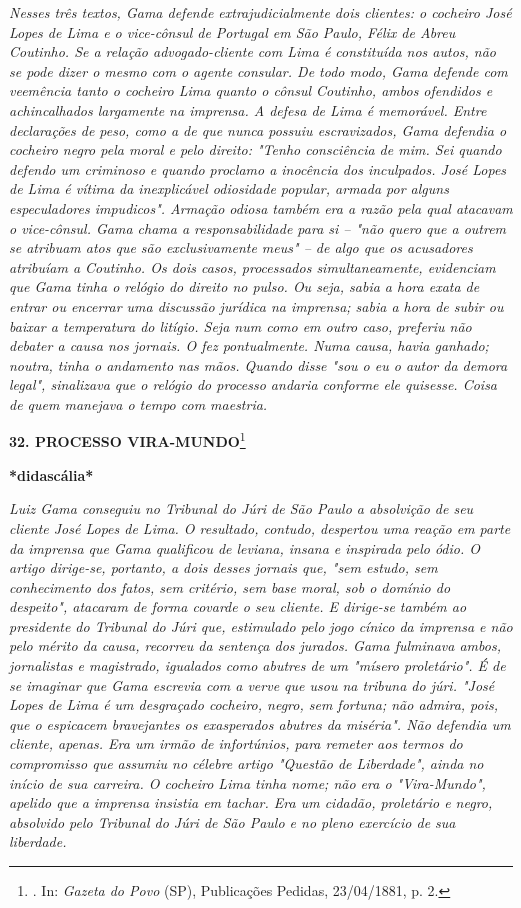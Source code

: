 \emph{Nesses três textos, Gama defende extrajudicialmente dois clientes:
o cocheiro José Lopes de Lima e o vice-cônsul de Portugal em São Paulo,
Félix de Abreu Coutinho. Se a relação advogado-cliente com Lima é
constituída nos autos, não se pode dizer o mesmo com o agente consular.
De todo modo, Gama defende com veemência tanto o cocheiro Lima quanto o
cônsul Coutinho, ambos ofendidos e achincalhados largamente na imprensa.
A defesa de Lima é memorável. Entre declarações de peso, como a de que
nunca possuiu escravizados, Gama defendia o cocheiro negro pela moral e
pelo direito: "Tenho consciência de mim. Sei quando defendo um criminoso
e quando proclamo a inocência dos inculpados. José Lopes de Lima é
vítima da inexplicável odiosidade popular, armada por alguns
especuladores impudicos". Armação odiosa também era a razão pela qual
atacavam o vice-cônsul. Gama chama a responsabilidade para si -- "não
quero que a outrem se atribuam atos que são exclusivamente meus" -- de
algo que os acusadores atribuíam a Coutinho. Os dois casos, processados
simultaneamente, evidenciam que Gama tinha o relógio do direito no
pulso. Ou seja, sabia a hora exata de entrar ou encerrar uma discussão
jurídica na imprensa; sabia a hora de subir ou baixar a temperatura do
litígio. Seja num como em outro caso, preferiu não debater a causa nos
jornais. O fez pontualmente. Numa causa, havia ganhado; noutra, tinha o
andamento nas mãos. Quando disse "sou o eu o autor da demora legal",
sinalizava que o relógio do processo andaria conforme ele quisesse.
Coisa de quem manejava o tempo com maestria. }

\textbf{32. PROCESSO VIRA-MUNDO}\footnote{. In: \emph{Gazeta do Povo}
  (SP), Publicações Pedidas, 23/04/1881, p. 2.}

\textbf{*didascália*}

\emph{Luiz Gama conseguiu no Tribunal do Júri de São Paulo a absolvição
de seu cliente José Lopes de Lima. O resultado, contudo, despertou uma
reação em parte da imprensa que Gama qualificou de leviana, insana e
inspirada pelo ódio. O artigo dirige-se, portanto, a dois desses jornais
que, "sem estudo, sem conhecimento dos fatos, sem critério, sem base
moral, sob o domínio do despeito", atacaram de forma covarde o seu
cliente. E dirige-se também ao presidente do Tribunal do Júri que,
estimulado pelo jogo cínico da imprensa e não pelo mérito da causa,
recorreu da sentença dos jurados. Gama fulminava ambos, jornalistas e
magistrado, igualados como abutres de um "mísero proletário". É de se
imaginar que Gama escrevia com a verve que usou na tribuna do júri.
"José Lopes de Lima é um desgraçado cocheiro, negro, sem fortuna; não
admira, pois, que o espicacem bravejantes os exasperados abutres da
miséria". Não defendia um cliente, apenas. Era um irmão de infortúnios,
para remeter aos termos do compromisso que assumiu no célebre artigo
"Questão de Liberdade", ainda no início de sua carreira. O cocheiro Lima
tinha nome; não era o "Vira-Mundo", apelido que a imprensa insistia em
tachar. Era um cidadão, proletário e negro, absolvido pelo Tribunal do
Júri de São Paulo e no pleno exercício de sua liberdade. }

